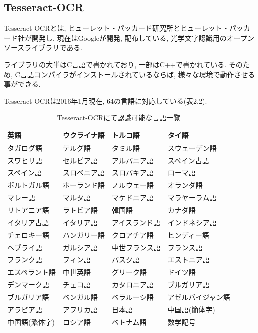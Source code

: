 \subsection{Tesseract-OCR}
Tesseract-OCRとは, ヒューレット・パッカード研究所とヒューレット・パッカード社が開発し, 現在はGoogleが開発, 配布している, 光学文字認識用のオープンソースライブラリである.

ライブラリの大半はC言語で書かれており, 一部はC++で書かれている.
そのため, C言語コンパイラがインストールされているならば, 様々な環境で動作させる事ができる.

Tesseract-OCRは2016年1月現在, 64の言語に対応している(表2.2).

\begin{table}[tb]
\begin{center}
\begin{tabular}{|p{3.5cm}|p{3.5cm}|p{3.5cm}|p{3.5cm}|} \hline
英語 & ウクライナ語 & トルコ語 & タイ語 \\ \hline
タガログ語 & テルグ語 & タミル語 & スウェーデン語 \\ \hline
スワヒリ語 & セルビア語 & アルバニア語 & スペイン古語 \\ \hline
スペイン語 & スロベニア語 & スロバキア語 & ローマ語 \\ \hline
ポルトガル語 & ポーランド語 & ノルウェー語 & オランダ語 \\ \hline
マレー語 & マルタ語 & マケドニア語 & マラヤーラム語 \\ \hline
リトアニア語 & ラトビア語 & 韓国語 & カナダ語 \\ \hline
イタリア古語 & イタリア語 & アイスランド語 & インドネシア語 \\ \hline
チェロキー語 & ハンガリー語 & クロアチア語 & ヒンディー語 \\ \hline
ヘブライ語 & ガルシア語 & 中世フランス語 & フランス語 \\ \hline
フランク語 & フィン語 & バスク語 & エストニア語 \\ \hline
エスペラント語 & 中世英語 & グリーク語 & ドイツ語 \\ \hline
デンマーク語 & チェコ語 & カタロニア語 & ブルガリア語 \\ \hline
ブルガリア語 & ベンガル語 & ベラルーシ語 & アゼルバイジャン語 \\ \hline
アラビア語 & アフリカ語 & 日本語 & 中国語(簡体字) \\ \hline
中国語(繁体字) & ロシア語 & ベトナム語 & 数学記号 \\ \hline
\end{tabular}
\caption{Tesseract-OCRにて認識可能な言語一覧}
\end{center}
\end{table}

